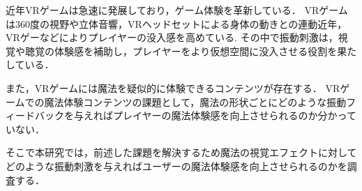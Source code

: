 近年VRゲームは急速に発展しており，ゲーム体験を革新している．
VRゲームは360度の視野や立体音響，VRヘッドセットによる身体の動きとの連動近年，VRゲーなどによりプレイヤーの没入感を高めている.
その中で振動刺激は，視覚や聴覚の体験感を補助し，プレイヤーをより仮想空間に没入させる役割を果たしている．


また，VRゲームには魔法を疑似的に体験できるコンテンツが存在する．
VRゲームでの魔法体験コンテンツの課題として，魔法の形状ごとにどのような振動フィードバックを与えればプレイヤーの魔法体験感を向上させられるのか分かっていない．

そこで本研究では，前述した課題を解決するため魔法の視覚エフェクトに対してどのような振動刺激を与えればユーザーの魔法体験感を向上させられるのかを調査する．